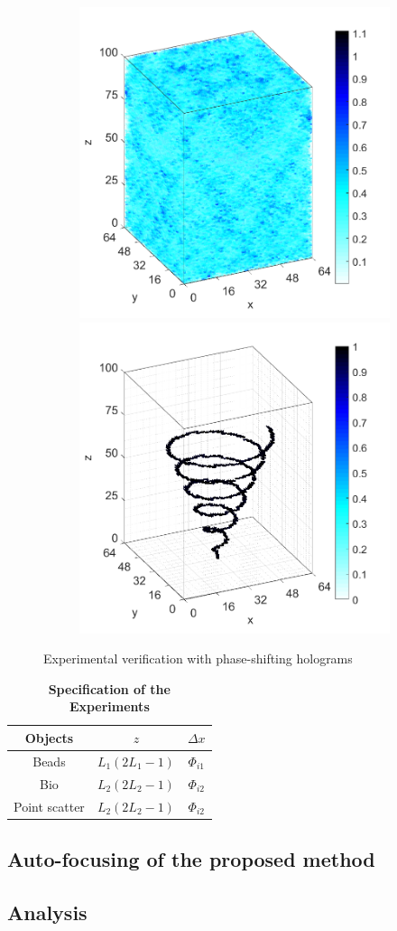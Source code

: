 \documentclass[9pt,twocolumn,twoside]{osajnl}
\begin{document}
\begin{figure}[H]
{\begin{subfigure}[b]{0.95\columnwidth}
\begin{minipage}[b]{0.15\columnwidth}
    \end{minipage}
    \includegraphics[width=0.33\columnwidth]{conhelix_complex_BP_3d}
    \includegraphics[width=0.33\columnwidth]{conhelix_complex_TwIST_3d}
    \caption{}
\end{subfigure}}
\caption{Experimental verification with phase-shifting holograms}
\label{fig_exp}
\end{figure}

\begin{table}[H]
\centering
\caption{\bf Specification of the Experiments}
\begin{tabular}{ccc}
\hline
Objects & $z$         & $\Delta x$ \\
\hline
Beads & $L_1(2L_1-1)$ & $\Phi_{i1}$ \\
Bio   & $L_2(2L_2-1)$ & $\Phi_{i2}$ \\
Point scatter  & $L_2(2L_2-1)$ & $\Phi_{i2}$ \\
\hline
\end{tabular}
\label{tb_expspec}
\end{table}

\subsection{Auto-focusing of the proposed method}

\subsection{Analysis}

\end{document}
